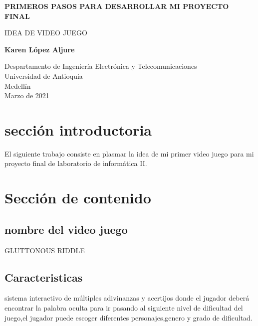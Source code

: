 \documentclass{article}
\begin{document}
\begin{titlepage}
    \begin{center}
        \vspace*{1cm}
            
        \Huge
        \textbf{PRIMEROS PASOS PARA DESARROLLAR MI PROYECTO FINAL}
            
        \vspace{0.5cm}
        \LARGE
        {IDEA DE VIDEO JUEGO}
        \vspace{1.5cm}
            
        \textbf{Karen López Aljure}
            
        \vfill
            
        \vspace{0.8cm}
            
        \Large
        Despartamento de Ingeniería Electrónica y Telecomunicaciones\\
        Universidad de Antioquia\\
        Medellín\\
        Marzo de 2021
            
    \end{center}
\end{titlepage}

\tableofcontents
\newpage
\section{sección introductoria}\label{intro}
El siguiente trabajo consiste en plasmar la idea de mi primer video juego para mi proyecto final de laboratorio de informática II.

\section{Sección de contenido} \label{contenido}

\subsection{nombre del video juego}
GLUTTONOUS RIDDLE


\subsection{Caracteristicas}
%
sistema interactivo de múltiples adivinanzas y acertijos donde el jugador deberá encontrar la palabra oculta para ir pasando al siguiente nivel de dificultad del juego,el jugador puede escoger diferentes personajes,genero y grado de dificultad.
\end{document}
